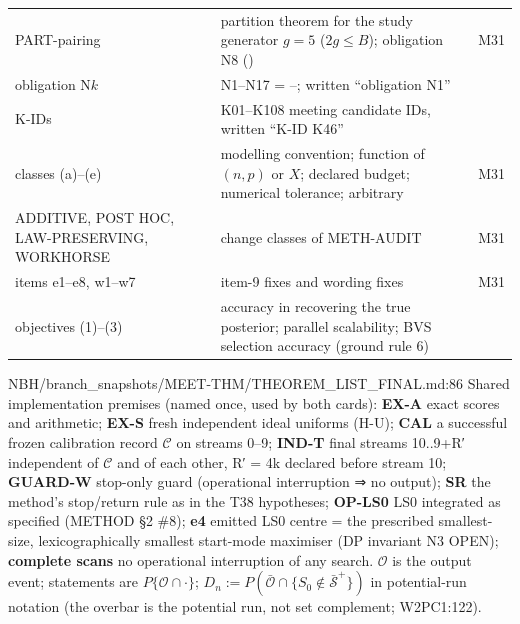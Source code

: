 {\begin{xltabular}{\linewidth}{@{}>{\raggedright\arraybackslash}p{2.3cm}>{\raggedright\arraybackslash}X>{\raggedright\arraybackslash}p{4.6cm}@{}}
PART-pairing & partition theorem for the study generator $g=5$ ($2g\le B$); obligation N8 () & M31 \\
obligation N$k$ & N1–N17 = –; written ``obligation N1'' & \\
K-IDs & K01–K108 meeting candidate IDs, written ``K-ID K46'' & \\
classes (a)–(e) & modelling convention; function of $(n,p)$ or $X$; declared budget; numerical tolerance; arbitrary & M31 \\
ADDITIVE, POST HOC, LAW-PRESERVING, WORKHORSE & change classes of METH-AUDIT & M31 \\
items e1–e8, w1–w7 & item-9 fixes and wording fixes & M31 \\
objectives (1)–(3) & accuracy in recovering the true posterior; parallel scalability; BVS selection accuracy (ground rule 6) & \\
\bottomrule
\end{xltabular}
}

\begin{stmt}{NBH/branch_snapshots/MEET-THM/THEOREM_LIST_FINAL.md:86}
Shared implementation premises (named once, used by both cards): \textbf{EX-A} exact scores and arithmetic; \textbf{EX-S} fresh independent
ideal uniforms (H-U); \textbf{CAL} a successful frozen calibration record $\mathcal C$ on streams 0–9; \textbf{IND-T} final streams 10..9+R′
independent of $\mathcal C$ and of each other, R′ = 4k declared before stream 10; \textbf{GUARD-W} stop-only guard (operational interruption
⇒ no output); \textbf{SR} the method's stop/return rule as in the T38 hypotheses; \textbf{OP-LS0} LS0 integrated as specified (METHOD §2 \#8);
\textbf{e4} emitted LS0 centre = the prescribed smallest-size, lexicographically smallest start-mode maximiser (DP invariant N3 OPEN);
\textbf{complete scans} no operational interruption of any search. $\mathcal O$ is the output event; statements are $P\{\mathcal O\cap\cdot\}$;
$D_n:=P(\bar{\mathcal O}\cap\{S_0\notin\bar{\mathcal S}^+\})$ in potential-run notation (the overbar is the potential run, not set
complement; W2PC1:122).
\end{stmt}

